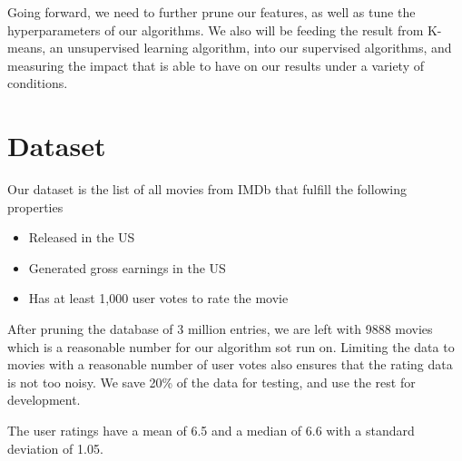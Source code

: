 \documentclass[journal]{IEEEtran}
\begin{document}
Going forward, we need to further prune our features, as well as tune the
hyperparameters of our algorithms.  We also will be feeding the result from K-means, an unsupervised learning algorithm, into our supervised algorithms, and measuring the impact that
is able to have on our results under a variety of conditions.

\section{Dataset}
Our dataset is the list of all movies from IMDb that fulfill the following properties
\begin{itemize}
	\item Released in the US
	\item Generated gross earnings in the US
	\item Has at least 1,000 user votes to rate the movie
\end{itemize}

\par After pruning the database of 3 million entries, we are left with 9888
movies which is a reasonable number for our algorithm sot run on. Limiting the
data to movies with a reasonable number of user votes also ensures that the
rating data is not too noisy. We save 20\% of the data for testing, and use the
rest for development.


The user ratings have a mean of 6.5 and a median of 6.6 with a standard deviation of 1.05.
\end{document}
